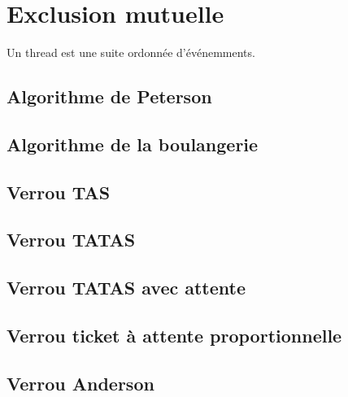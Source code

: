 \documentclass[11pt,a4paper]{report}
\begin{document}
\chapter{Exclusion mutuelle} %
\label{cha:Exclusion mutuelle}
Un thread est une suite ordonnée d'événemments.

\section{Algorithme de Peterson} %
\label{sec:Algorithme de Peterson}


\section{Algorithme de la boulangerie} %
\label{sec:Algorithme de la boulangerie}


\section{Verrou TAS} %
\label{sec:Verrou TAS}


\section{Verrou TATAS} %
\label{sec:Verrou TATAS}


\section{Verrou TATAS avec attente} %
\label{sec:Verrou TATAS avec attente}


\section{Verrou ticket à attente proportionnelle} %
\label{sec:Verrou ticket à attente proportionnelle}


\section{Verrou Anderson} %
\label{sec:Verrou Anderson}
\end{document}
